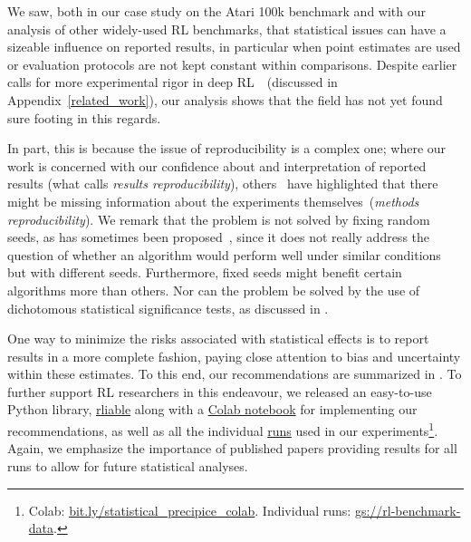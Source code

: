 

We saw, both in our case study on the Atari 100k benchmark and with our analysis of other widely-used RL benchmarks, that statistical issues can have a sizeable influence on reported results, in particular when point estimates are used or evaluation protocols are not kept constant within comparisons. 
Despite earlier calls for more experimental rigor in deep RL~\citep{henderson2018deep, colas2018many, colas2019hitchhiker, jordan2020evaluating, chan2019measuring,recht-2018}~(discussed in Appendix~\ref{related_work}), our analysis shows that the field has not yet found sure footing in this regards. 

In part, this is because the issue of reproducibility is a complex one; where our work is concerned with our confidence about and interpretation of reported results (what \citet{goodman2016does} calls \emph{results reproducibility}), others~\citep{pineau2020improving} have highlighted that there might be missing information about the experiments themselves~(\emph{methods reproducibility}). We remark that the problem is not solved by fixing random seeds, as has sometimes been proposed~\citep{nagarajan2018deterministic, kolesnikov2019catalyst}, since it does not really address the question of whether an algorithm would perform well under similar conditions but with different seeds. Furthermore, fixed seeds might benefit certain algorithms more than others. Nor can the problem be solved by the use of dichotomous statistical significance tests, as discussed in .

One way to minimize the risks associated with statistical effects is to report results in a more complete fashion, paying close attention to bias and uncertainty within these estimates. To this end, our recommendations are summarized in .
To further support RL researchers in this endeavour, we released an easy-to-use Python library, \href{https://github.com/google-research/rliable}{\ttfamily rliable} along with a \href{https://bit.ly/drl\_precipice\_colab}{Colab notebook} for implementing our recommendations, as well as all the individual \href{https://console.cloud.google.com/storage/browser/rl-benchmark-data/}{runs} used in our experiments\footnote{Colab: \href{https://bit.ly/statistical\_precipice\_colab}{\ttfamily  bit.ly/statistical\_precipice\_colab}. Individual runs: \href{https://console.cloud.google.com/storage/browser/rl-benchmark-data/}{\ttfamily gs://rl-benchmark-data}.}. Again, we emphasize the importance of published papers providing results for all runs to allow for future statistical analyses.

